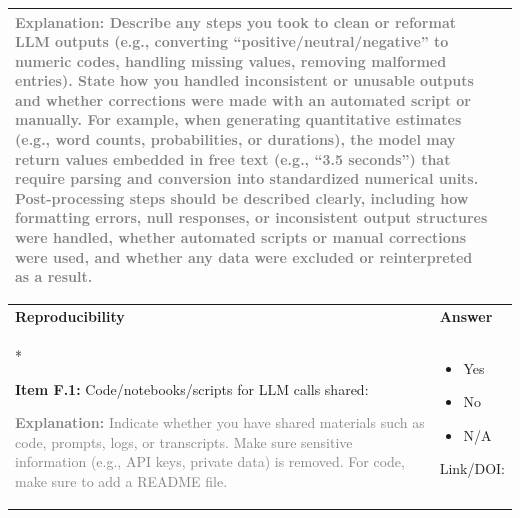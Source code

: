 \documentclass[12pt]{article}
\newcommand{\unchecked}{\ding{111}} %
\begin{document}
\begin{longtable}{|p{}|p{}|}
\textcolor{gray}{{\footnotesize
\textbf{Explanation:} Describe any steps you took to clean or reformat LLM outputs (e.g., converting “positive/neutral/negative” to numeric codes, handling missing values, removing malformed entries). State how you handled inconsistent or unusable outputs and whether corrections were made with an automated script or manually. For example, when generating quantitative estimates (e.g., word counts, probabilities, or durations), the model may return values embedded in free text (e.g., “3.5 seconds”) that require parsing and conversion into standardized numerical units. Post-processing steps should be described clearly, including how formatting errors, null responses, or inconsistent output structures were handled, whether automated scripts or manual corrections were used, and whether any data were excluded or reinterpreted as a result.
}}
& \\
\hline
\end{longtable}

\begin{longtable}{|p{}|p{}|}
\hline
\rowcolor{green!20}
\textbf{{Reproducibility}} & \textbf{Answer} \\*   %
\hline

\textbf{Item F.1:} Code/notebooks/scripts for LLM calls shared:

\textcolor{gray}{{\footnotesize
\textbf{Explanation:} Indicate whether you have shared materials such as code, prompts, logs, or transcripts. Make sure sensitive information (e.g., API keys, private data) is removed. For code, make sure to add a README file.
}}
&
\begin{itemize}[leftmargin=*]\setlength{\itemsep}{0pt}\setlength{\parskip}{0pt}
    \item[\unchecked] Yes
    \item[\unchecked] No
    \item[\unchecked] N/A
\end{itemize}

Link/DOI: \\
\hline
\end{longtable}
\end{document}
